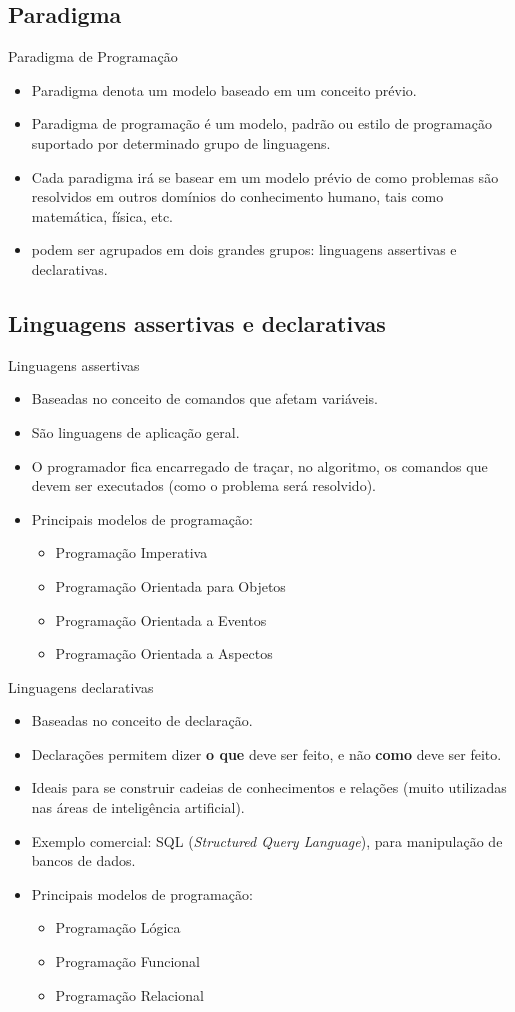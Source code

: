 \documentclass[handout, aspectratio=169]{beamer}
\newcommand{\bi}{\begin{itemize}[<+->]}
\newcommand{\ei}{\end{itemize}}
\begin{document}
\subsection{Paradigma}


\begin{frame}{Paradigma de Programação}
    \bi
    \item Paradigma denota um modelo baseado em um conceito prévio.
    \item Paradigma de programação é um modelo, padrão ou estilo de programação suportado por determinado grupo de linguagens.
    \item Cada paradigma irá se basear em um modelo prévio de como problemas são resolvidos em outros domínios do conhecimento humano, tais como matemática, física, etc.
    \item podem ser agrupados em dois grandes grupos: linguagens assertivas e declarativas.
    \ei
\end{frame}



\subsection{Linguagens assertivas e declarativas}


\begin{frame}{Linguagens assertivas}
    \bi
    \item Baseadas no conceito de comandos que afetam variáveis.
    \item São linguagens de aplicação geral.
    \item O programador fica encarregado de traçar, no algoritmo, os comandos que devem ser executados (como o problema será resolvido).
    \item Principais modelos de programação:
        \bi
            \item Programação Imperativa
            \item Programação Orientada para Objetos
            \item Programação Orientada a Eventos
            \item Programação Orientada a Aspectos
        \ei
    \ei
\end{frame}


\begin{frame}{Linguagens declarativas}
    \bi
    \item Baseadas no conceito de declaração.
    \item Declarações permitem dizer \textbf{o que} deve ser feito, e não \textbf{como} deve ser feito.
    \item Ideais para se construir cadeias de conhecimentos e relações (muito utilizadas nas áreas de inteligência artificial).
    \item Exemplo comercial: SQL (\textit{Structured Query Language}), para manipulação de bancos de dados.
    \item Principais modelos de programação:
    \bi
    \item Programação Lógica
    \item Programação Funcional
    \item Programação Relacional
    \ei
    \ei
\end{frame}
\end{document}
